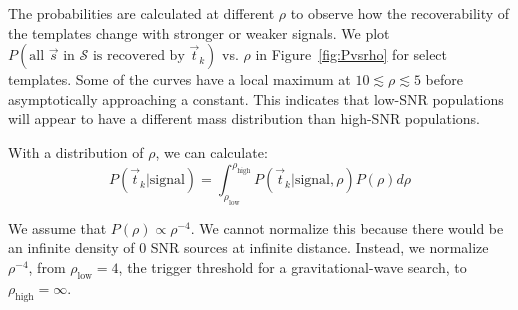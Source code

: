 \documentclass[twocolumn,showpacs,unsortedaddress,superscriptaddress,showkeys,nofootinbib,preprintnumbers,letterpaper]{revtex4-1}
\begin{document}
The probabilities are calculated at different $\rho$ to observe how the recoverability of the templates change with stronger or weaker signals. We plot $P(\text{all $\vec{s}$ in $\mathcal{S}$ is recovered by $\vec{t}_k$})$ vs. $\rho$ in Figure~\ref{fig:Pvsrho} for select templates. Some of the curves have a local maximum at $10\lesssim \rho\lesssim 5$ before asymptotically approaching a constant. This indicates that low-SNR populations will appear to have a different mass distribution than high-SNR populations.

With a distribution of $\rho$, we can calculate:
	\begin{equation}
	P(\vec{t}_k|\text{signal}) = \int_{\rho_{\text{low}}}^{\rho_{\text{high}}} P(\vec{t}_k|\text{signal},\rho) P(\rho) d\rho
	\end{equation}

We assume that $P(\rho)\propto\rho^{-4}$. We cannot normalize this because there would be an infinite density of 0 SNR sources at infinite distance. Instead, we normalize $\rho^{-4}$, from $\rho_{\text{low}}=4$, the trigger threshold for a gravitational-wave search, to $\rho_{\text{high}}=\infty$.
\end{document}
